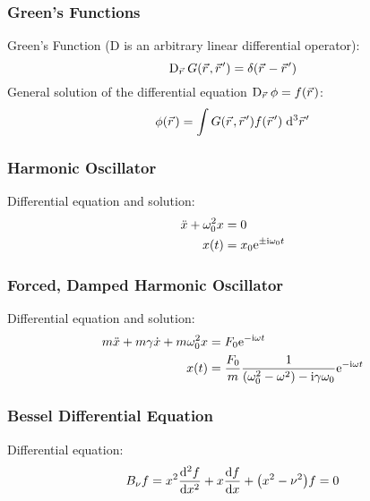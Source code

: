 		\subsubsection{Green's Functions}
			\noindent
			Green's Function ($\mathrm{D}$ is an arbitrary linear differential operator):
			\begin{equation}
				\mathrm{D}_{\vec{r}}\, G\qty(\vec{r},\vec{r}') = \delta\qty(\vec{r} - \vec{r}')
			\end{equation}
			General solution of the differential equation $\mathrm{D}_{\vec{r}}\, \phi = f\qty(\vec{r})$:
			\begin{equation}
				\phi\qty(\vec{r}) = \int G\qty(\vec{r},\vec{r}')f\qty(\vec{r}')\;\dd^3\vec{r}'
			\end{equation}

		\subsubsection{Harmonic Oscillator}
			\noindent
			Differential equation and solution:
			\begin{equation}
				\begin{aligned}
					\ddot{x}+\omega_0^2 x &= 0 \\
					x(t) &= x_0 \mathrm{e}^{\pm \mathrm{i}\omega_0 t}
				\end{aligned}
			\end{equation}

		\subsubsection{Forced, Damped Harmonic Oscillator}
			\noindent
			Differential equation and solution:
			\begin{equation}
				\begin{aligned}
					m\ddot{x}+m\gamma\dot{x}+m\omega_0^2 x &= F_0 \mathrm{e}^{-\mathrm{i}\omega t} \\
					x(t) &= \frac{F_0}{m} \frac{1}{\left(\omega_0^2-\omega^2\right)-\mathrm{i} \gamma\omega_0} \mathrm{e}^{-\mathrm{i}\omega t}
				\end{aligned}
			\end{equation}

		\subsubsection{Bessel Differential Equation}
			\noindent
			Differential equation:
			\begin{equation}
				B_\nu f = x^2\dv[2]{f}{x} + x\dv{f}{x}+\qty(x^2-\nu^2)f = 0
			\end{equation}

